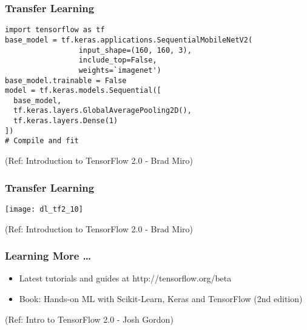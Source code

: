 \begin{frame}[fragile] \frametitle{Transfer Learning}

\begin{lstlisting}
import tensorflow as tf 
base_model = tf.keras.applications.SequentialMobileNetV2(
                 input_shape=(160, 160, 3),
                 include_top=False,
                 weights=`imagenet')
base_model.trainable = False
model = tf.keras.models.Sequential([
  base_model,
  tf.keras.layers.GlobalAveragePooling2D(),
  tf.keras.layers.Dense(1)
])
# Compile and fit
\end{lstlisting}


\tiny{(Ref: Introduction to TensorFlow 2.0 - Brad Miro)}
\end{frame}
\begin{frame}[fragile] \frametitle{Transfer Learning}

\begin{center}
\texttt{[image: dl\_tf2\_10]}
\end{center}




\tiny{(Ref: Introduction to TensorFlow 2.0 - Brad Miro)}
\end{frame}

\begin{frame}[fragile] \frametitle{Learning More \ldots}

\begin{itemize}
\item  Latest tutorials and guides at http://tensorflow.org/beta
\item Book: Hands-on ML with Scikit-Learn, Keras and TensorFlow (2nd edition) 
\end{itemize}
\tiny{(Ref: Intro to TensorFlow 2.0 - Josh Gordon)}
\end{frame}